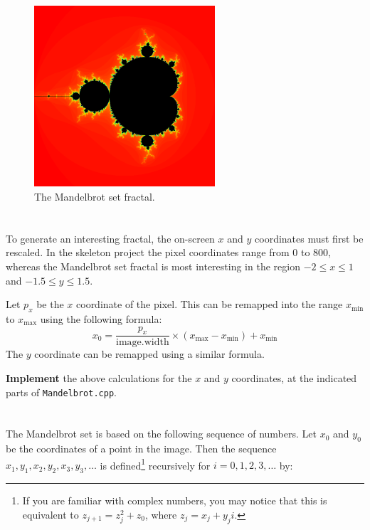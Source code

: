 \documentclass{../../../fal_assignment}
\begin{document}
\begin{figure}[!h]
	\begin{center}
		\includegraphics[width=0.6\textwidth]{mandelbrot.png}
	\end{center}
	\caption{The Mandelbrot set fractal.}
	\label{fig:mandelbrot}
\end{figure}

\section{} \label{core-c-first}

To generate an interesting fractal, the on-screen $x$ and $y$ coordinates must first be rescaled.
In the skeleton project the pixel coordinates range from $0$ to $800$,
whereas the Mandelbrot set fractal is most interesting in the region $-2 \leq x \leq 1$ and $-1.5 \leq y \leq 1.5$.

Let $p_x$ be the $x$ coordinate of the pixel. This can be remapped into the range $x_{\text{min}}$ to $x_{\text{max}}$ using the following formula:
\begin{equation*}
x_0 = \frac{p_x}{\text{image.width}} \times \left( x_{\text{max}} - x_{\text{min}} \right) + x_{\text{min}}
\end{equation*}
The $y$ coordinate can be remapped using a similar formula.

\textbf{Implement} the above calculations for the $x$ and $y$ coordinates, at the indicated parts of \texttt{Mandelbrot.cpp}.

\section{} \label{core-c-last}

The Mandelbrot set is based on the following sequence of numbers. Let $x_0$ and $y_0$ be the coordinates of a point in the image.
Then the sequence $x_1, y_1, x_2, y_2, x_3, y_3, \dots$ is defined\footnote{%
	If you are familiar with complex numbers, you may notice that this is equivalent to $z_{j+1} = z_j^2 + z_0$, where $z_j = x_j + y_j i$.
} recursively for $i = 0, 1, 2, 3, \dots$ by:
\end{document}

